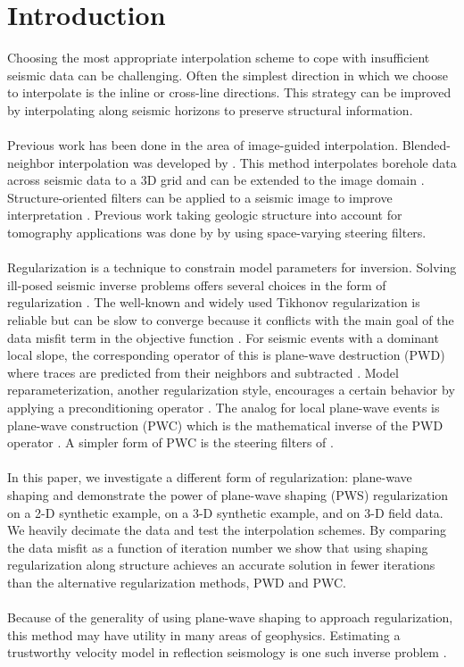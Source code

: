 \section{Introduction}
Choosing the most appropriate interpolation scheme to cope with insufficient seismic data can be challenging. Often the simplest direction in which we choose to interpolate is the inline or cross-line directions. This strategy can be improved by interpolating along seismic horizons to preserve structural information. \\
\\
Previous work has been done in the area of image-guided interpolation. Blended-neighbor interpolation was developed by \citet[]{hale09a,hale10}. This method interpolates borehole data across seismic data to a 3D grid and can be extended to the image domain \cite[]{naeini14}. Structure-oriented filters can be applied to a seismic image to improve interpretation \cite[]{fehmers03,liu10}. Previous work taking geologic structure into account for tomography applications was done by \cite{clapp04} by using space-varying steering filters.\\
\\
Regularization is a technique to constrain model parameters for inversion. Solving ill-posed seismic inverse problems offers several choices in the form of regularization \cite[]{engl96,zhdanov02}. The well-known and widely used Tikhonov regularization \cite[]{tikhonov63} is reliable but can be slow to converge because it conflicts with the main goal of the data misfit term in the objective function \cite[]{harlan95}. For seismic events with a dominant local slope, the corresponding operator of this is plane-wave destruction (PWD) where traces are predicted from their neighbors and subtracted \cite[]{fomel02}. Model reparameterization, another regularization style, encourages a certain behavior by applying a preconditioning operator \cite[]{fomel03}. The analog for local plane-wave events is plane-wave construction (PWC) which is the mathematical inverse of the PWD operator \cite[]{fomel06}. A simpler form of PWC is the steering filters of \cite{clapp98}.\\
\\
In this paper, we investigate a different form of regularization: plane-wave shaping \cite[]{fomel07} and demonstrate the power of plane-wave shaping (PWS) regularization on a 2-D synthetic example, on a 3-D synthetic example, and on 3-D field data. We heavily decimate the data and test the interpolation schemes. By comparing the data misfit as a function of iteration number we show that using shaping regularization along structure achieves an accurate solution in fewer iterations than the alternative regularization methods, PWD and PWC.\\
\\
Because of the generality of using plane-wave shaping to approach regularization, this method may have utility in many areas of geophysics. Estimating a trustworthy velocity model in reflection seismology is one such inverse problem \cite[]{clapp04,woodward08}.\\
\\
